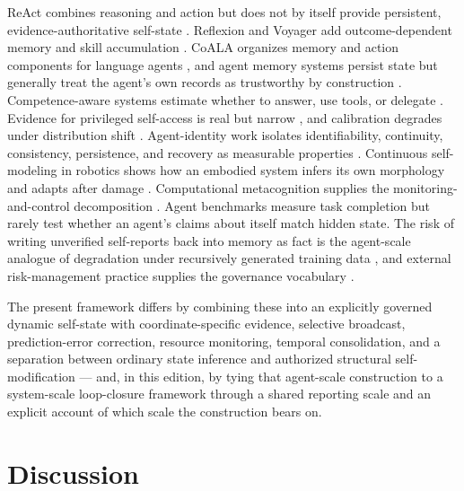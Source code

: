 \documentclass[11pt]{article}
\begin{document}
ReAct combines reasoning and action but does not by itself provide persistent, evidence-authoritative self-state \citep{yao2023react}. Reflexion and Voyager add outcome-dependent memory and skill accumulation \citep{shinn2023reflexion,wang2023voyager}. CoALA organizes memory and action components for language agents \citep{sumers2024coala}, and agent memory systems persist state but generally treat the agent's own records as trustworthy by construction \citep{packer2023memgpt,park2023generative}. Competence-aware systems estimate whether to answer, use tools, or delegate \citep{kadavath2022know,valiente2025muse,qian2025smart,wang2026metacogagent}. Evidence for privileged self-access is real but narrow \citep{binder2024introspection,li2025metacognitive,naphade2026introspection}, and calibration degrades under distribution shift \citep{guo2017calibration}. Agent-identity work isolates identifiability, continuity, consistency, persistence, and recovery as measurable properties \citep{perrier2025identity}. Continuous self-modeling in robotics shows how an embodied system infers its own morphology and adapts after damage \citep{bongard2006resilient}. Computational metacognition supplies the monitoring-and-control decomposition \citep{cox2022metacognition,flavell1979metacognition,nelson1990metamemory}. Agent benchmarks measure task completion \citep{mialon2023gaia,liu2024agentbench,jimenez2024swebench} but rarely test whether an agent's claims about itself match hidden state. The risk of writing unverified self-reports back into memory as fact is the agent-scale analogue of degradation under recursively generated training data \citep{shumailov2024collapse}, and external risk-management practice supplies the governance vocabulary \citep{nist2023rmf}.

The present framework differs by combining these into an explicitly governed dynamic self-state with coordinate-specific evidence, selective broadcast, prediction-error correction, resource monitoring, temporal consolidation, and a separation between ordinary state inference and authorized structural self-modification --- and, in this edition, by tying that agent-scale construction to a system-scale loop-closure framework through a shared reporting scale and an explicit account of which scale the construction bears on.

\section{Discussion}
\label{sec:discussion}
\end{document}

